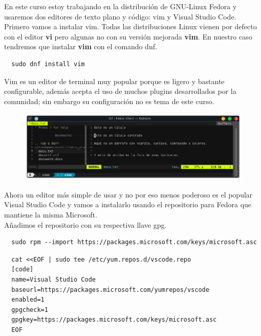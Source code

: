 \documentclass{article}
\begin{document}
En este curso estoy trabajando en la distribución de GNU-Linux Fedora y
usaremos dos editores de texto plano y código: vim y Visual Studio Code.\\

Primero vamos a instalar vim. Todas las distribuciones Linux vienen por defecto
con el editor \textbf{vi} pero algunas no con su versión mejorada \textbf{vim}.
En nuestro caso tendremos que instalar \textbf{vim} con el comando dnf.

\begin{verbatim}
  sudo dnf install vim
\end{verbatim}

Vim es un editor de terminal muy popular porque es ligero y bastante
configurable, además acepta el uso de muchos plugins desarrollados por la
comunidad; sin embargo su configuración no es tema de este curso.

\begin{figure}[h!]
  \centering
  \includegraphics[scale=0.75]{./Pictures/054_vim_txt.png}
\end{figure}

Ahora un editor más simple de usar y no por eso menos poderoso es el popular
Visual Studio Code y vamos a instalarlo usando el repositorio para Fedora que
mantiene la misma Microsoft.\\

Añadimos el repositorio con su respectiva llave gpg.

\begin{verbatim}
  sudo rpm --import https://packages.microsoft.com/keys/microsoft.asc
\end{verbatim}

\begin{verbatim}
  cat <<EOF | sudo tee /etc/yum.repos.d/vscode.repo
  [code]
  name=Visual Studio Code
  baseurl=https://packages.microsoft.com/yumrepos/vscode
  enabled=1
  gpgcheck=1
  gpgkey=https://packages.microsoft.com/keys/microsoft.asc
  EOF
\end{verbatim}

\newpage
\end{document}
